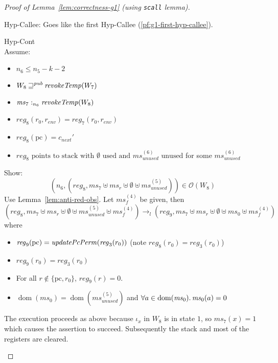 \documentclass[a4paper]{article}
\DeclareMathOperator{\dom}{dom}
\newcommand{\var}[1]{\mathit{#1}}
\newcommand{\hs}{\var{ms}}
\newcommand{\ms}{\hs}
\newcommand{\pcreg}{\mathrm{pc}}
\newcommand{\reg}{\var{reg}}
\newcommand{\heap}{\var{mem}}
\newcommand{\env}{\var{env}}
\newcommand{\unused}{\var{unused}}
\newcommand{\plainfun}[2]{
  \ifthenelse{\equal{#2}{}}
  {\mathit{#1}}
  {\mathit{#1}(#2)}
}
\newcommand{\updatePcPerm}[1]{\plainfun{updatePcPerm}{#1}}
\newcommand{\revokeTemp}[1]{\plainfun{revokeTemp}{#1}}
\newcommand{\futurewk}{\mathbin{\sqsupseteq}^{\var{pub}}}
\newcommand{\heapSat}[3][\heap]{#1 :_{#2} #3}
\newcommand{\memSat}[3][n]{\heapSat[#2]{#1}{#3}}
\newcommand{\observations}{\mathcal{O}}
\newcommand{\npair}[2][n]{\left(#1,#2 \right)}
\newcommand{\step}[1][]{\rightarrow_{#1}}
\begin{document}
\begin{proof}[Proof of Lemma~\ref{lem:correctness-g1} (using \texttt{scall} lemma)]
\begin{enumproof}[resume]
\begin{enumproof}
          \item Hyp-Callee: Goes like the first Hyp-Callee (\ref{pf:g1-first-hyp-callee}).
          \item Hyp-Cont\\
            Assume:
            \begin{itemize}
            \item $n_6 \leq n_5-k-2$
            \item $W_8 \futurewk \revokeTemp{W_7}$
            \item $\memSat[n_6]{\ms_7}{\revokeTemp{W_8}}$ 
            \item $\reg_8(r_0,r_\env) = \reg_7(r_0,r_\env)$
            \item $\reg_8(\pcreg) = c_{\var{next}}'$
            \item $\reg_8 \text{ points to stack with $\emptyset$ used and $\ms_{\mathit{unused}}^{(6)}$ unused}$ for some $\ms_{\mathit{unused}}^{(6)}$
            \end{itemize}
            Show:
            \[
              \npair[n_6]{(\reg_8,\ms_7 \uplus \ms_r \uplus \emptyset \uplus \ms_\unused^{(5)})} \in \observations(W_8)
            \]
            Use Lemma~\ref{lem:anti-red-obs}. Let $\ms_f^{(4)}$ be given, then
            \[
              (\reg_8,\ms_7 \uplus \ms_r \uplus \emptyset \uplus \ms_\unused^{(5)} \uplus \ms_f^{(4)}) \step[l] (reg_9,\ms_7 \uplus \ms_r \uplus \emptyset \uplus \ms_0 \uplus \ms_f^{(4)})
            \]
            where
            \begin{itemize}
            \item $\reg_9(\pcreg) = \updatePcPerm{\reg_3(r_0)}$ (note $\reg_8(r_0) = \reg_3(r_0)$)
            \item $\reg_9(r_0) = reg_3(r_0)$
            \item For all $r \not\in \{\pcreg,r_0\}$, $\reg_9(r) = 0$.
            \item $\dom(\ms_0) = \dom(\ms_\unused^{(5)})$ and $\forall a \in \dom(\ms_0) \ldotp \ms_0(a) = 0$
            \end{itemize}
            The execution proceeds as above because $\iota_x$ in $W_8$ is in state $1$, so $\ms_7(x) = 1$ which causes the assertion to succeed. Subsequently the stack and most of the registers are cleared.


\end{enumproof}
\end{enumproof}
\end{proof}
\end{document}
